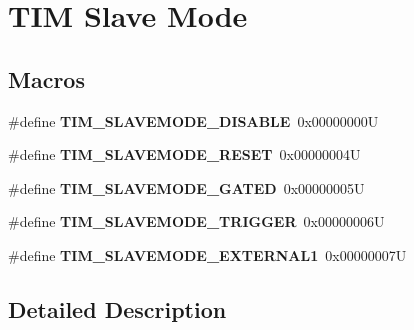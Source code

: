 \hypertarget{group___t_i_m___slave___mode}{}\section{T\+IM Slave Mode}
\label{group___t_i_m___slave___mode}
\subsection*{Macros}
\begin{DoxyCompactItemize}
\item 
\mbox{\label{group___t_i_m___slave___mode_ga3b53e1a85d08f125df4371f86bdaf79b}} 
\#define {\bfseries T\+I\+M\+\_\+\+S\+L\+A\+V\+E\+M\+O\+D\+E\+\_\+\+D\+I\+S\+A\+B\+LE}~0x00000000U
\item 
\mbox{\label{group___t_i_m___slave___mode_ga9f28e350c0560dc550f5c0d2f8b39ba7}} 
\#define {\bfseries T\+I\+M\+\_\+\+S\+L\+A\+V\+E\+M\+O\+D\+E\+\_\+\+R\+E\+S\+ET}~0x00000004U
\item 
\mbox{\label{group___t_i_m___slave___mode_ga4501317fcd7649e5ff46db6fe69938e0}} 
\#define {\bfseries T\+I\+M\+\_\+\+S\+L\+A\+V\+E\+M\+O\+D\+E\+\_\+\+G\+A\+T\+ED}~0x00000005U
\item 
\mbox{\label{group___t_i_m___slave___mode_ga12f8f7b4a16b438f54cf811f0bb0a8a4}} 
\#define {\bfseries T\+I\+M\+\_\+\+S\+L\+A\+V\+E\+M\+O\+D\+E\+\_\+\+T\+R\+I\+G\+G\+ER}~0x00000006U
\item 
\mbox{\label{group___t_i_m___slave___mode_ga90dcf32a66dcb250b18da2ff56471328}} 
\#define {\bfseries T\+I\+M\+\_\+\+S\+L\+A\+V\+E\+M\+O\+D\+E\+\_\+\+E\+X\+T\+E\+R\+N\+A\+L1}~0x00000007U
\end{DoxyCompactItemize}


\subsection{Detailed Description}
